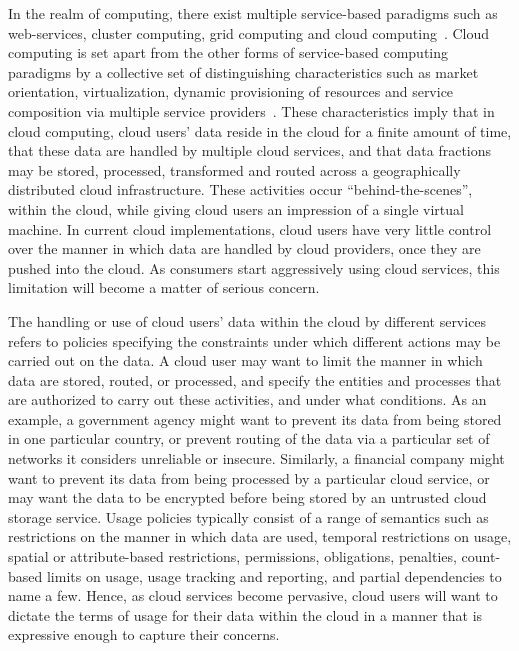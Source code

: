 \documentclass[notitlepage]{book}
\begin{document}
\begin{doublespace}
In the realm of computing, there exist multiple service-based paradigms such as web-services, cluster computing, grid computing and cloud computing~\cite{Bu:09}. Cloud computing is set apart from the other forms of service-based computing paradigms by a collective set of distinguishing characteristics such as market orientation, virtualization, dynamic provisioning of resources and service composition via multiple service providers~\cite{BuYeVeBrBr:09}. These characteristics imply that in cloud computing,  cloud users' data reside in the cloud for a finite amount of time, that these data are handled by multiple cloud services, and that data fractions may be stored, processed, transformed and routed across a geographically distributed cloud infrastructure. These activities occur ``behind-the-scenes'', within the cloud, while giving cloud users an impression of a single virtual machine.  In current cloud implementations,  cloud users have very little control over the manner in which data are handled by cloud providers, once they are pushed into the cloud. As consumers start aggressively using cloud services, this limitation will become a matter of serious concern. 

The handling or use of cloud users' data within the cloud by different services refers to policies specifying the constraints under which different actions may be carried out on the data. A cloud user may want to limit the manner in which data are stored, routed, or processed, and specify the entities and processes that are authorized to carry out these activities, and under what conditions. As an example, a government agency might want to prevent its data from being stored in one particular country, or prevent routing of the data via a particular set of networks it considers unreliable or insecure. Similarly, a financial company might want to prevent its data from being processed by a particular cloud service, or may want the data to be encrypted before being stored by an untrusted cloud storage service. Usage policies typically consist of a range of semantics such as restrictions on the manner in which data are used, temporal restrictions on usage, spatial or attribute-based restrictions, permissions, obligations, penalties, count-based limits on usage, usage tracking and reporting, and partial dependencies to name a few.   Hence, as cloud services become pervasive, cloud users will want to dictate the terms of usage for their data within the cloud in a manner that is expressive enough to capture their concerns. 


\end{doublespace}
\end{document}
